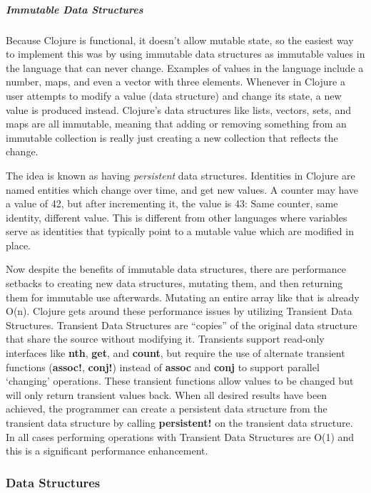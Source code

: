     \subparagraph{Immutable Data Structures}
    
    Because Clojure is functional, it doesn't allow mutable state, so the easiest way to implement this was by using immutable data structures as immutable values in the language that can never change. Examples of values in the language include a number, maps, and even a vector with three elements. Whenever in Clojure a user attempts to modify a value (data structure) and change its state, a new value is produced instead. Clojure's data structures like lists, vectors, sets, and maps are all immutable, meaning that adding or removing something from an immutable collection is really just creating a new collection that reflects the change.  
    
    The idea is known as having \textit{persistent} data structures. Identities in Clojure are named entities which change over time, and get new values. A counter may have a value of 42, but after incrementing it, the value is 43: Same counter, same identity, different value. This is different from other languages where variables serve as identities that typically point to a mutable value which are modified in place. \cite{clojure_website:reference}
    
    Now despite the benefits of immutable data structures, there are performance setbacks to creating new data structures, mutating them, and then returning them for immutable use afterwards. Mutating an entire array like that is already O(n). Clojure gets around these performance issues by utilizing Transient Data Structures. Transient Data Structures are ``copies'' of the original data structure that share the source without modifying it. Transients support read-only interfaces like \textbf{nth}, \textbf{get}, and \textbf{count}, but require the use of alternate transient functions (\textbf{assoc!}, \textbf{conj!}) instead of \textbf{assoc} and \textbf{conj} to support parallel `changing' operations. These transient functions allow values to be changed but will only return transient values back. When all desired results have been achieved, the programmer can create a persistent data structure from the transient data structure by calling \textbf{persistent!} on the transient data structure. In all cases performing operations with Transient Data Structures are O(1) and this is a significant performance enhancement.
 
\subsubsection{Data Structures}

